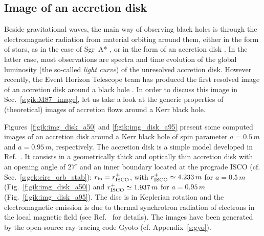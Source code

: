 \subsection{Image of an accretion disk} \label{s:gik:image_disk}

Beside gravitational waves, the main way of observing black holes is through
the electromagnetic radiation from material orbiting around them,
either in the form of stars, as in the case of Sgr~A*  \cite{Abute_al18a,Abute_al20}, or in the
form of an accretion disk \cite{AbramF13}.
In the latter case, most observations are spectra and time evolution of the
global luminosity (the so-called \emph{light curve}) of the
unresolved accretion disk.
However recently, the Event Horizon Telescope team has produced the first
resolved image of an accretion disk around a black hole
\cite{EHT19a,Wielg_al20}.
In order to discuss this image in Sec.~\ref{s:gik:M87_image},
let us take a look at the generic properties of (theoretical) images of accretion flows around
a Kerr black hole.

Figures~\ref{f:gik:img_disk_a50} and \ref{f:gik:img_disk_a95}
present some computed images of an accretion disk around a Kerr black hole
of spin parameter $a=0.5\, m$ and $a=0.95\, m$, respectively.
The accretion disk is a simple model developed in Ref.~\cite{VinceWAGLPG21}.
It consists in a geometrically thick and optically thin accretion disk with
an opening angle of $27^\circ$ and an inner boundary
located at the prograde ISCO (cf. Sec.~\ref{s:gek:circ_orb_stab}):
$r_{\rm in} = r_{\rm ISCO}^+$, with
$r_{\rm ISCO}^+ \simeq 4.233 \, m$
for $a=0.5\, m$ (Fig.~\ref{f:gik:img_disk_a50})
and
$r_{\rm ISCO}^+ \simeq 1.937\, m$
for $a=0.95\, m$ (Fig.~\ref{f:gik:img_disk_a95}). The disc is in Keplerian rotation
and the electromagnetic emission is due to thermal synchrotron radiation
of electrons in the local magnetic field (see Ref.~\cite{VinceWAGLPG21} for details).
The images have been generated by the open-source ray-tracing code
\textsf{Gyoto} \cite{VincePGP11} (cf. Appendix~\ref{s:gyo}).



